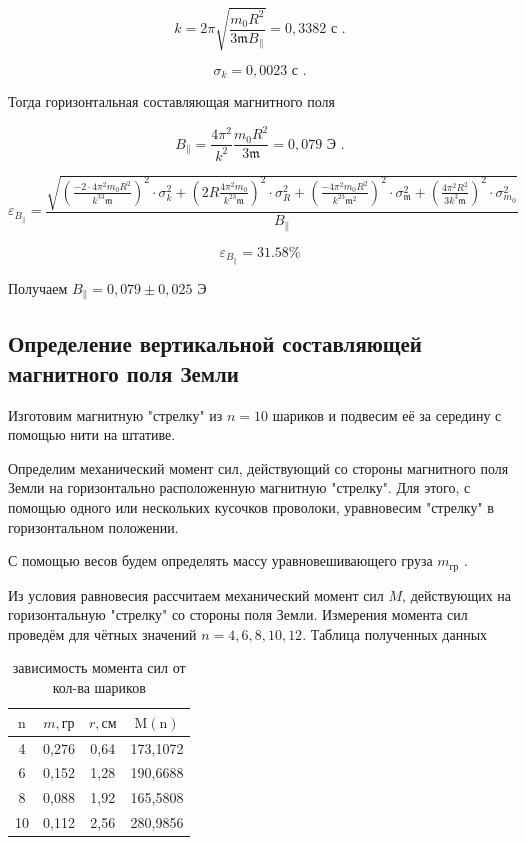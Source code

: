 \documentclass[a4paper, 12pt]{article}%
\begin{document}
\[k = 2\pi \sqrt{\frac{m_0 R^{2}}{3 \mathfrak{m} B_{\|}}} = 0,3382 \text{ с } . \]

\[ \sigma_k = 0,0023\text{ с } .\]

Тогда горизонтальная составляющая магнитного поля 

\[B_{\|} = \frac{4\pi^2}{k^2}\frac{m_0R^2}{3\mathfrak{m}} = 0,079 \text{ Э }. \]

\[ \varepsilon_{B_{\|}} = \frac{\sqrt{ (\frac{-2\cdot 4\pi^2m_0R^2}{k^33\mathfrak{m}})^2\cdot \sigma^2_k + (2R\frac{4\pi^2 m_0}{k^23\mathfrak{m}})^2\cdot \sigma^2_{R} + (\frac{-4\pi^2 m_0R^2}{k^23\mathfrak{m}^2})^2\cdot \sigma^2_{\mathfrak{m}} + (\frac{4\pi^2R^2}{3k^3\mathfrak{m}})^2\cdot \sigma^2_{m_0} }}{B_{\|}}\]

\[ \varepsilon_{B_{\|}} = 31.58\% \]

Получаем $B_{\|} = 0,079 \pm 0,025 \text{ Э }$

\subsection{Определение вертикальной составляющей магнитного поля Земли}

Изготовим магнитную "стрелку" из $n = 10$ шариков и подвесим её за середину с помощью нити на штативе. 

Определим механический момент сил, действующий со стороны магнитного поля Земли на горизонтально расположенную магнитную "стрелку". Для этого, с помощью одного или нескольких кусоч­ков проволоки, уравновесим "стрелку" в горизонтальном положении.

С помощью весов будем определять массу уравновешивающего груза $m_{\text{гр}}$ .

Из условия равновесия рассчитаем механический момент сил $M$, действующих на горизонтальную "стрелку" со стороны поля Земли. Измерения момента сил проведём для чётных значений $n = 4, 6, 8, 10, 12$. Таблица полученных данных

\begin{table}[!h]
\begin{center}
\begin{tabular}{|c|c|c|c|}
\hline $\mathrm{n}$ & $m, \text{гр}$ & $r, \text{см}$ & $\mathrm{M}(\mathrm{n})$ \\
\hline 4 & 0,276 & 0,64 & 173,1072 \\
\hline 6 & 0,152 & 1,28 & 190,6688 \\
\hline 8 & 0,088 & 1,92 & 165,5808 \\
\hline 10 & 0,112 & 2,56 & 280,9856 \\
\hline
\end{tabular}
\caption{зависимость момента сил от кол-ва шариков}
\end{center}
\end{table}
\end{document}
